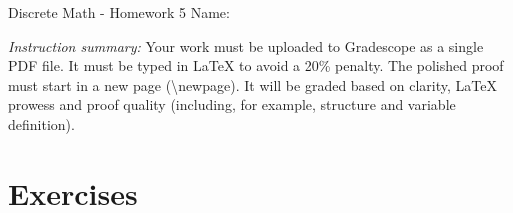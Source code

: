 \documentclass[12pt]{article}
\begin{document}
\begin{center}
    {\LARGE Discrete Math - Homework 5} \Large \newline
    Name:
\end{center}

\vspace{1em}

\noindent \emph{Instruction summary:} Your work must be uploaded to Gradescope as a single PDF file. It must be typed in LaTeX to avoid a 20\% penalty. The polished proof must start in a new page (\textbackslash{newpage}). It will be graded based on clarity, LaTeX prowess and proof quality (including, for example, structure and variable definition).

\section*{Exercises}
\end{document}
